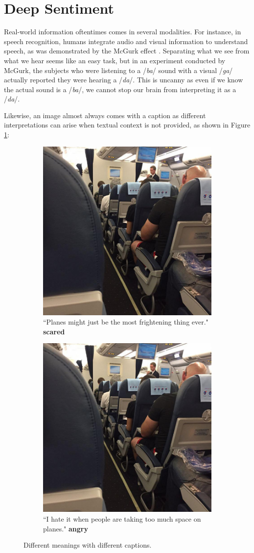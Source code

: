 \documentclass{article} %
\begin{document}
\section{Deep Sentiment}
Real-world information oftentimes comes in several modalities. For instance, in speech recognition, humans integrate audio and visual information to understand speech, as was demonstrated by the McGurk effect \citep{McGurk-76}. Separating what we see from what we hear seems like an easy task, but in an experiment conducted by McGurk, the subjects who were listening to a /{\em ba}/ sound with a visual /{\em ga}/ actually reported they were hearing a /{\em da}/. This is uncanny as even if we know the actual sound is a /{\em ba}/, we cannot stop our brain from interpreting it as a /{\em da}/.

Likewise, an image almost always comes with a caption as different interpretations can arise when textual context is not provided, as shown in Figure \ref{ambiguous}:

\begin{figure}[H]
    \begin{subfigure}{.5\textwidth}
        \centering
        \includegraphics[width=0.5\linewidth]{Images/scared.jpg}
        \caption{``Planes might just be the most frightening thing ever." \textbf{scared}}
    \end{subfigure}
    \begin{subfigure}{.5\textwidth}
        \centering
        \includegraphics[width=0.5\linewidth]{Images/scared.jpg}
        \caption{``I hate it when people are taking too much space on planes." \textbf{angry}}
    \end{subfigure}
    \caption{Different meanings with different captions.}
    \label{ambiguous}
\end{figure}
\end{document}
